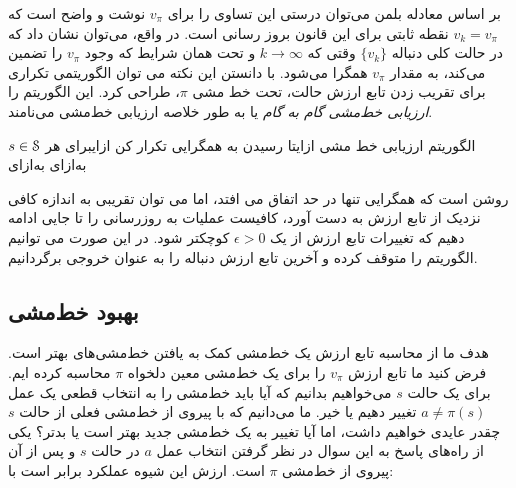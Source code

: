  بر اساس معادله بلمن می‌توان درستی این تساوی را برای 
$v_{\pi}$
نوشت و واضح است که 
 $v_k = v_{\pi}$
 نقطه ثابتی برای این قانون بروز رسانی است.
 در واقع، می‌توان نشان داد که در حالت کلی دنباله 
 $\{ v_k \}$
وقتی که 
$ k \rightarrow \infty $
و تحت همان شرایط که وجود 
$v_{\pi}$
را تضمین می‌کند، به مقدار 
$v_{\pi}$
همگرا می‌شود. با دانستن این نکته می توان الگوریتمی تکراری برای  تقریب زدن تابع ارزش حالت، تحت خط مشی $\pi$، طراحی کرد. این الگوریتم را 
\textit{ارزیابی خط‌مشی گام به گام}
 یا به طور خلاصه 
ارزیابی خط‌مشی
 می‌نامند.


{الگوریتم ارزیابی خط مشی}
‌ازای{تا رسیدن به همگرایی تکرار کن}
‌ازای{برای هر $s \in \EuScript{S}$}
‌به‌ازای
‌به‌ازای

روشن است که همگرایی تنها در حد اتفاق می افتد، اما می توان تقریبی به اندازه کافی نزدیک از تابع ارزش به دست آورد، کافیست عملیات به روزرسانی را تا جایی ادامه دهیم که تغییرات تابع ارزش از یک
$\epsilon > 0$
کوچکتر شود. در این صورت می توانیم الگوریتم را متوقف کرده و آخرین تابع ارزش دنباله را به عنوان خروجی برگردانیم.

% 
%

\subsection{بهبود خط‌مشی}

هدف ما از محاسبه تابع ارزش یک خط‌مشی کمک به یافتن خط‌مشی‌های بهتر است.
فرض کنید ما تابع ارزش 
$v_{\pi}$
 را برای یک خط‌مشی معین  دلخواه 
 $\pi$
  محاسبه کرده ایم. برای یک حالت 
  $s$
 می‌خواهیم بدانیم که آیا باید خط‌مشی را به انتخاب قطعی یک عمل 
 $a \neq \pi(s)$
  تغییر دهیم یا خیر.
ما می‌دانیم که با پیروی از خط‌مشی فعلی از حالت
 $s$
  چقدر عایدی خواهیم داشت، اما آیا تغییر به یک خط‌مشی جدید بهتر است یا بدتر؟
  یکی از راه‌های پاسخ به این سوال در نظر گرفتن انتخاب عمل  
  $a$
در حالت 
$s$
و پس از آن پیروی از خط‌مشی
$\pi$
 است. 
 ارزش این شیوه عملکرد برابر است با:
 
